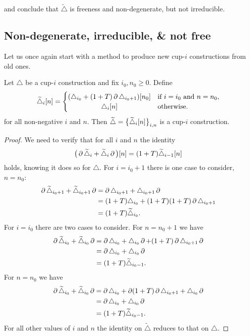 \vspace*{1em}
\noindent and conclude that $\widetilde\triangle$ is freeness and non-degenerate, but not irreducible.

\subsection{Non-degenerate, irreducible, \& not free}

Let us once again start with a method to produce new cup-$i$ constructions from old ones.

\begin{lemma}
	Let $\triangle$ be a cup-$i$ construction and fix $i_0,n_0 \geq 0$.
	Define
	\[
	\widetilde\triangle_i[n] =
	\begin{cases}
		(\triangle_{i_0} + (1+T)\bd\triangle_{i_0+1})[n_0] & \text{if } i=i_0 \text{ and } n=n_0, \\
		\hfil\triangle_{i}[n] & \text{otherwise}.
	\end{cases}
	\]
	for all non-negative $i$ and $n$.
	Then $\widetilde\triangle = \set[\big]{\widetilde\triangle_i[n]}_{i,n}$ is a cup-$i$ construction.
\end{lemma}

\begin{proof}
	We need to verify that for all $i$ and $n$ the identity
	\[
	\big(\bd \widetilde\triangle_{i} + \widetilde\triangle_{i}\bd\big)[n] =
	(1+T) \widetilde\triangle_{i-1}[n]
	\]
	holds, knowing it does so for $\triangle$.
	For $i = i_0+1$ there is one case to consider, $n = n_0$:
	\begin{align*}
		\bd\widetilde\triangle_{i_0+1} + \widetilde\triangle_{i_0+1}\bd &=
		\bd\triangle_{i_0+1} + \triangle_{i_0+1}\bd \\ &=
		(1+T)\triangle_{i_0} + (1+T)(1+T)\bd\triangle_{i_0+1}\\ &=
		(1+T)\widetilde\triangle_{i_0}.
	\end{align*}
	For $i = i_0$ there are two cases to consider.
	For $n = n_0+1$ we have
	\begin{align*}
		\bd\widetilde\triangle_{i_0} + \widetilde\triangle_{i_0}\bd &=
		\bd\triangle_{i_0} + \triangle_{i_0}\bd + (1+T)\bd\triangle_{i_0+1}\bd \\ &=
		\bd\triangle_{i_0} + \triangle_{i_0}\bd\\ &=
		(1+T)\widetilde\triangle_{i_0-1}.
	\end{align*}
	For $n = n_0$ we have
	\begin{align*}
		\bd\widetilde\triangle_{i_0} + \widetilde\triangle_{i_0}\bd &=
		\bd\triangle_{i_0} + \bd(1+T)\bd\triangle_{i_0+1} + \triangle_{i_0}\bd \\ &=
		\bd\triangle_{i_0} + \triangle_{i_0}\bd\\ &=
		(1+T)\widetilde\triangle_{i_0-1}.
	\end{align*}
	For all other values of $i$ and $n$ the identity on $\widetilde\triangle$ reduces to that on $\triangle$.
\end{proof}

